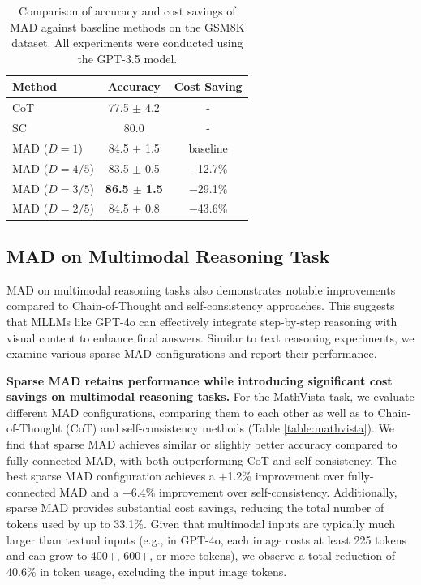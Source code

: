 \documentclass[11pt]{article}
\begin{document}
\begin{table}
  \centering
  \begin{tabular}{l|cc}
    \hline
    \textbf{Method} & Accuracy & Cost Saving \\
    \hline
    CoT & 77.5 $\pm$ 4.2 &  - \\
    SC  & 80.0 &  - \\
    \hline
    MAD ($D=1$) & 84.5 $\pm$ 1.5 & baseline \\
    MAD ($D=4/5$) & 83.5 $\pm$ 0.5 & $-$12.7\% \\
    MAD ($D=3/5$) & \textbf{86.5 $\pm$ 1.5} & $-$29.1\% \\
    MAD ($D=2/5$) & 84.5 $\pm$ 0.8 & $-$43.6\% \\
    \hline
  \end{tabular}
 \caption{Comparison of accuracy and cost savings of MAD against baseline methods on the GSM8K dataset. All experiments were conducted using the GPT-3.5 model.}
\label{table:gsm8k}
\end{table}

\subsection{MAD on Multimodal Reasoning Task}
MAD on multimodal reasoning tasks also demonstrates notable improvements compared to Chain-of-Thought and self-consistency approaches. This suggests that MLLMs like GPT-4o can effectively integrate step-by-step reasoning with visual content to enhance final answers. Similar to text reasoning experiments, we examine various sparse MAD configurations and report their performance.

\textbf{Sparse MAD retains performance while introducing significant cost savings on multimodal reasoning tasks.} For the MathVista task, we evaluate different MAD configurations, comparing them to each other as well as to Chain-of-Thought (CoT) and self-consistency methods (Table \ref{table:mathvista}). We find that sparse MAD achieves similar or slightly better accuracy compared to fully-connected MAD, with both outperforming CoT and self-consistency. The best sparse MAD configuration achieves a $+$1.2\% improvement over fully-connected MAD and a $+$6.4\% improvement over self-consistency. Additionally, sparse MAD provides substantial cost savings, reducing the total number of tokens used by up to 33.1\%. Given that multimodal inputs are typically much larger than textual inputs (e.g., in GPT-4o, each image costs at least 225 tokens and can grow to 400$+$, 600$+$, or more tokens), we observe a total reduction of 40.6\% in token usage, excluding the input image tokens.
\end{document}
